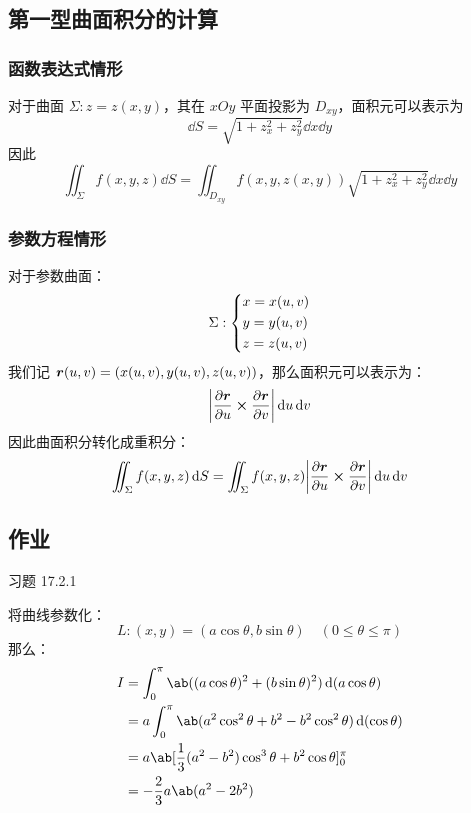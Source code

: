 \subsection{第一型曲面积分的计算}

\subsubsection{函数表达式情形}

对于曲面 $\Sigma: z = z(x, y)$，其在 $xOy$ 平面投影为 $D_{xy}$，面积元可以表示为
$$
\dd{S} = \sqrt{1 + z_x^2 + z_y^2} \dd{x} \dd{y}
$$
因此
$$
\iint_{\Sigma} f(x, y, z) \dd{S} = \iint_{D_{xy}} f(x, y, z(x, y)) \sqrt{1 + z_x^2 + z_y^2} \dd{x} \dd{y}
$$

\subsubsection{参数方程情形}

对于参数曲面：
$$
\Sigma: \begin{dcases}
	x = x(u, v) \\
	y = y(u, v) \\
	z = z(u, v)
\end{dcases}
$$
我们记 $\boldsymbol{r}(u, v) = (x(u, v), y(u, v), z(u, v))$，那么面积元可以表示为：
$$
\abs{\pdv{\vect{r}}{u} \cp \pdv{\vect{r}}{v}} \dd{u} \dd{v}
$$
因此曲面积分转化成重积分：
$$
\iint_{\Sigma} f(x, y, z) \dd{S} = \iint_{\Sigma} f(x, y, z) \abs{\pdv{\vect{r}}{u} \cp \pdv{\vect{r}}{v}} \dd{u} \dd{v}
$$

\subsection{作业}

\begin{problem}
	习题 17.2.1
	\begin{solution}
		将曲线参数化：
		$$
		L: (x, y) = (a \cos \theta, b \sin \theta) \quad (0 \le \theta \le \pi)
		$$
		那么：
		$$
		\begin{aligned}
			I & = \int_{0}^{\pi} \ab((a \cos \theta)^2 + (b \sin \theta)^2) \dd(a \cos \theta) \\
			& = a \int_{0}^{\pi} \ab(a^2 \cos^2 \theta + b^2 - b^2 \cos^2 \theta) \dd(\cos \theta) \\
			& = a \ab[\frac{1}{3} (a^2 - b^2) \cos^3 \theta + b^2 \cos \theta]_{0}^{\pi} \\
			& = -\frac{2}{3} a \ab(a^2 - 2 b^2)
		\end{aligned}
		$$
	\end{solution}
\end{problem}

